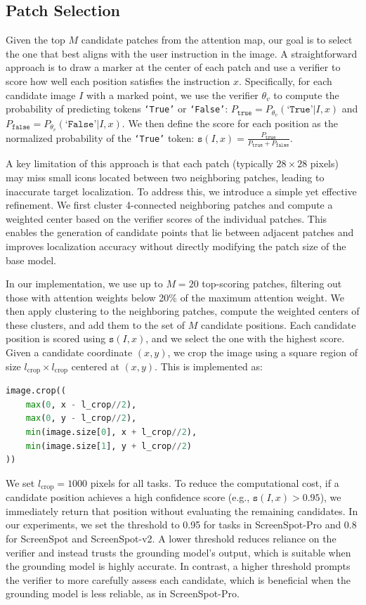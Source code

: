 \documentclass{article}
\begin{document}
\subsection{Patch Selection}
\label{appendix:patch_selection}
Given the top $M$ candidate patches from the attention map, our goal is to select the one that best aligns with the user instruction in the image. A straightforward approach is to draw a marker at the center of each patch and use a verifier to score how well each position satisfies the instruction $x$. Specifically, for each candidate image $I$ with a marked point, we use the verifier $\theta_v$ to compute the probability of predicting tokens \texttt{`True'} or \texttt{`False'}:
$P_{\texttt{true}} = P_{\theta_v}(\texttt{`True'}|I,x)$ and $P_{\texttt{false}} = P_{\theta_v}(\texttt{`False'}|I,x)$. We then define the score for each position as the normalized probability of the \texttt{`True'} token: $\texttt{s}(I,x)=\frac{P_{\texttt{true}}}{P_{\texttt{true}} + P_{\texttt{false}}}$.


A key limitation of this approach is that each patch (typically $28 \times 28$ pixels) may miss small icons located between two neighboring patches, leading to inaccurate target localization. To address this, we introduce a simple yet effective refinement. We first cluster 4-connected neighboring patches and compute a weighted center based on the verifier scores of the individual patches. This enables the generation of candidate points that lie between adjacent patches and improves localization accuracy without directly modifying the patch size of the base model.

In our implementation, we use up to $M=20$ top-scoring patches, filtering out those with attention weights below 20\% of the maximum attention weight. We then apply clustering to the neighboring patches, compute the weighted centers of these clusters, and add them to the set of $M$ candidate positions. Each candidate position is scored using $\texttt{s}(I,x)$, and we select the one with the highest score. Given a candidate coordinate $(x, y)$, we crop the image using a square region of size $l_{\text{crop}} \times l_{\text{crop}}$ centered at $(x, y)$. This is implemented as:
\begin{lstlisting}[language=Python]
image.crop((
    max(0, x - l_crop//2),
    max(0, y - l_crop//2),
    min(image.size[0], x + l_crop//2),
    min(image.size[1], y + l_crop//2)
))
\end{lstlisting}
We set $l_{\text{crop}} = 1000$ pixels for all tasks. To reduce the computational cost, if a candidate position achieves a high confidence score (e.g., $\texttt{s}(I, x) > 0.95$), we immediately return that position without evaluating the remaining candidates. In our experiments, we set the threshold to 0.95 for tasks in ScreenSpot-Pro and 0.8 for ScreenSpot and ScreenSpot-v2. A lower threshold reduces reliance on the verifier and instead trusts the grounding model’s output, which is suitable when the grounding model is highly accurate. In contrast, a higher threshold prompts the verifier to more carefully assess each candidate, which is beneficial when the grounding model is less reliable, as in ScreenSpot-Pro.
\end{document}
